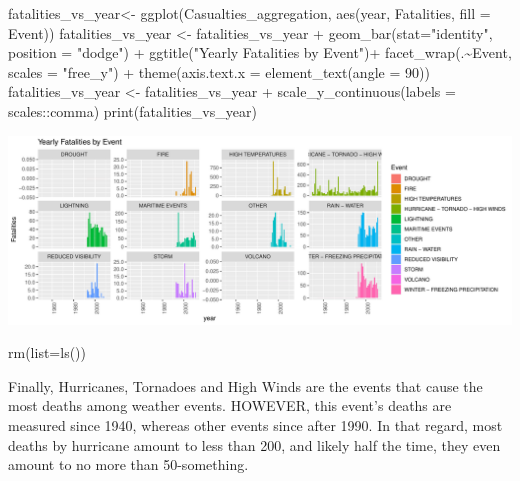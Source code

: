 \documentclass[
]{article}
\newenvironment{Shaded}{\begin{snugshade}}{\end{snugshade}}
\newcommand{\AttributeTok}[1]{\textcolor[rgb]{0.77,0.63,0.00}{#1}}
\newcommand{\DecValTok}[1]{\textcolor[rgb]{0.00,0.00,0.81}{#1}}
\newcommand{\FunctionTok}[1]{\textcolor[rgb]{0.00,0.00,0.00}{#1}}
\newcommand{\NormalTok}[1]{#1}
\newcommand{\OtherTok}[1]{\textcolor[rgb]{0.56,0.35,0.01}{#1}}
\newcommand{\SpecialCharTok}[1]{\textcolor[rgb]{0.00,0.00,0.00}{#1}}
\newcommand{\StringTok}[1]{\textcolor[rgb]{0.31,0.60,0.02}{#1}}
\begin{document}
\begin{Shaded}
\begin{Highlighting}[]
\NormalTok{fatalities\_vs\_year}\OtherTok{\textless{}{-}} \FunctionTok{ggplot}\NormalTok{(Casualties\_aggregation, }\FunctionTok{aes}\NormalTok{(year, Fatalities, }\AttributeTok{fill =}\NormalTok{ Event))}
\NormalTok{fatalities\_vs\_year }\OtherTok{\textless{}{-}}\NormalTok{ fatalities\_vs\_year }\SpecialCharTok{+} \FunctionTok{geom\_bar}\NormalTok{(}\AttributeTok{stat=}\StringTok{"identity"}\NormalTok{, }\AttributeTok{position =} \StringTok{"dodge"}\NormalTok{) }\SpecialCharTok{+} \FunctionTok{ggtitle}\NormalTok{(}\StringTok{"Yearly Fatalities by Event"}\NormalTok{)}\SpecialCharTok{+} \FunctionTok{facet\_wrap}\NormalTok{(.}\SpecialCharTok{\textasciitilde{}}\NormalTok{Event, }\AttributeTok{scales =} \StringTok{"free\_y"}\NormalTok{) }\SpecialCharTok{+} \FunctionTok{theme}\NormalTok{(}\AttributeTok{axis.text.x =} \FunctionTok{element\_text}\NormalTok{(}\AttributeTok{angle =} \DecValTok{90}\NormalTok{))}
\NormalTok{fatalities\_vs\_year }\OtherTok{\textless{}{-}}\NormalTok{ fatalities\_vs\_year  }\SpecialCharTok{+} \FunctionTok{scale\_y\_continuous}\NormalTok{(}\AttributeTok{labels =}\NormalTok{ scales}\SpecialCharTok{::}\NormalTok{comma)}
\FunctionTok{print}\NormalTok{(fatalities\_vs\_year)}
\end{Highlighting}
\end{Shaded}

\includegraphics{RepData_PeerAssessment2_files/figure-latex/Fatalities Results-2.pdf}

\begin{Shaded}
\begin{Highlighting}[]
\FunctionTok{rm}\NormalTok{(}\AttributeTok{list=}\FunctionTok{ls}\NormalTok{())}
\end{Highlighting}
\end{Shaded}

Finally, Hurricanes, Tornadoes and High Winds are the events that cause
the most deaths among weather events. HOWEVER, this event's deaths are
measured since 1940, whereas other events since after 1990. In that
regard, most deaths by hurricane amount to less than 200, and likely
half the time, they even amount to no more than 50-something.
\end{document}
